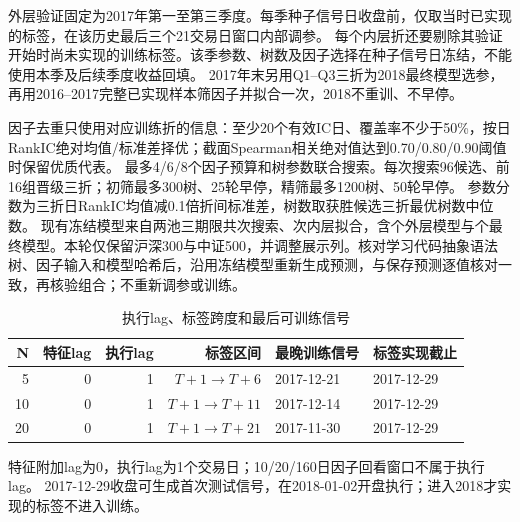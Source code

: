 \documentclass[10pt,compsoc,UTF8]{CjC}
\begin{document}
外层验证固定为2017年第一至第三季度。每季种子信号日收盘前，仅取当时已实现的标签，在该历史最后三个21交易日窗口内部调参。
每个内层折还要剔除其验证开始时尚未实现的训练标签。该季参数、树数及因子选择在种子信号日冻结，不能使用本季及后续季度收益回填。
2017年末另用Q1--Q3三折为2018最终模型选参，再用2016--2017完整已实现样本筛因子并拟合一次，2018不重训、不早停。

因子去重只使用对应训练折的信息：至少20个有效IC日、覆盖率不少于50\%，按日RankIC绝对均值/标准差择优；截面Spearman相关绝对值达到0.70/0.80/0.90阈值时保留优质代表。
最多4/6/8个因子预算和树参数联合搜索。每次搜索96候选、前16组晋级三折；初筛最多300树、25轮早停，精筛最多1200树、50轮早停。
参数分数为三折日RankIC均值减0.1倍折间标准差，树数取获胜候选三折最优树数中位数。
现有冻结模型来自两池三期限共\Searches 次搜索、\CVFits 次内层拟合，含\ValidationModels 个外层模型与\Models 个最终模型。本轮仅保留沪深300与中证500，并调整展示列。核对学习代码抽象语法树、因子输入和模型哈希后，沿用冻结模型重新生成预测，与保存预测逐值核对一致，再核验组合；不重新调参或训练。

\begin{table}[H]\centering\normalsize
\caption{执行lag、标签跨度和最后可训练信号}
\setlength{\tabcolsep}{4pt}
\begin{tabular}{rrrrll}\toprule
N & 特征lag & 执行lag & 标签区间 & 最晚训练信号 & 标签实现截止\\\midrule
5 & 0 & 1 & $T+1\to T+6$ & 2017-12-21 & 2017-12-29 \\
10 & 0 & 1 & $T+1\to T+11$ & 2017-12-14 & 2017-12-29 \\
20 & 0 & 1 & $T+1\to T+21$ & 2017-11-30 & 2017-12-29 \\
\bottomrule
\end{tabular}\end{table}
特征附加lag为0，执行lag为1个交易日；10/20/160日因子回看窗口不属于执行lag。
2017-12-29收盘可生成首次测试信号，在2018-01-02开盘执行；进入2018才实现的标签不进入训练。

\clearpage
\end{document}
